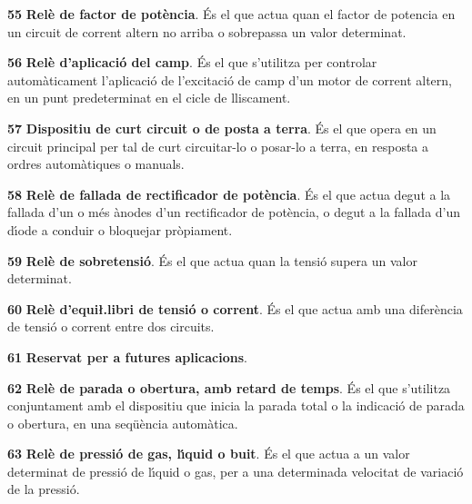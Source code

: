 \begin{multicols}{2}
\begin{list}{}
\item[\textbf{55}]  \textbf{Rel\`{e} de factor de pot\`{e}ncia}.
\'{E}s el que actua quan el factor de potencia en un circuit de corrent altern no arriba o
sobrepassa un valor determinat.

\item[\textbf{56}]  \textbf{Rel\`{e} d'aplicaci\'{o} del camp}.
\'{E}s el que s'utilitza per controlar autom\`{a}ticament l'aplicaci\'{o} de l'excitaci\'{o} de camp d'un
motor de corrent altern, en un punt predeterminat en el cicle de lliscament.

\item[\textbf{57}] 
\textbf{Dispositiu de curt circuit o de posta a terra}. \'{E}s el que
opera en un circuit principal per tal de curt circuitar-lo  o
posar-lo a terra, en resposta a ordres autom\`{a}tiques o manuals.

\item[\textbf{58}]  \textbf{Rel\`{e} de
fallada de rectificador de pot\`{e}ncia}. \'{E}s el que actua degut a la fallada d'un o m\'{e}s \`{a}nodes
d'un rectificador de pot\`{e}ncia, o degut a la fallada d'un d\'{\i}ode a conduir o bloquejar
pr\`{o}piament.

\item[\textbf{59}]  \textbf{Rel\`{e} de sobretensi\'{o}}. \'{E}s el que
actua quan la tensi\'{o} supera un valor determinat.

\item[\textbf{60}]  \textbf{Rel\`{e} d'equi{\l.l}ibri de
tensi\'{o} o corrent}. \'{E}s el que actua amb una difer\`{e}ncia de tensi\'{o} o
corrent entre dos circuits.

\item[\textbf{61}] \textbf{Reservat per a  futures aplicacions}.

\item[\textbf{62}]  \textbf{Rel\`{e} de
parada o obertura, amb retard de temps}. \'{E}s el que s'utilitza
conjuntament amb el dispositiu que inicia la parada total o la
indicaci\'{o} de parada o obertura, en una seq\"{u}\`{e}ncia autom\`{a}tica.

\item[\textbf{63}]  \textbf{Rel\`{e} de pressi\'{o}
de gas, l\'{\i}quid o buit}. \'{E}s el que actua a un valor determinat de pressi\'{o} de l\'{\i}quid o gas,
per a una determinada velocitat de variaci\'{o} de la pressi\'{o}.


\end{list}
\end{multicols}
